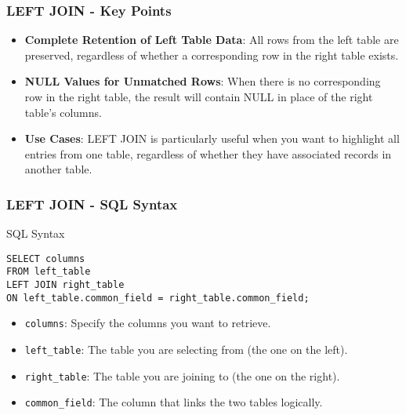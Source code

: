 \documentclass[aspectratio=169]{beamer}
\begin{document}
\begin{frame}[fragile]
    \frametitle{LEFT JOIN - Key Points}
    \begin{itemize}
        \item \textbf{Complete Retention of Left Table Data}: All rows from the left table are preserved, regardless of whether a corresponding row in the right table exists.
        
        \item \textbf{NULL Values for Unmatched Rows}: When there is no corresponding row in the right table, the result will contain NULL in place of the right table's columns.
        
        \item \textbf{Use Cases}: LEFT JOIN is particularly useful when you want to highlight all entries from one table, regardless of whether they have associated records in another table.
    \end{itemize}
\end{frame}

\begin{frame}[fragile]
    \frametitle{LEFT JOIN - SQL Syntax}
    \begin{block}{SQL Syntax}
    \begin{lstlisting}
SELECT columns
FROM left_table
LEFT JOIN right_table
ON left_table.common_field = right_table.common_field;
    \end{lstlisting}
    \end{block}

    \begin{itemize}
        \item \texttt{columns}: Specify the columns you want to retrieve.
        \item \texttt{left\_table}: The table you are selecting from (the one on the left).
        \item \texttt{right\_table}: The table you are joining to (the one on the right).
        \item \texttt{common\_field}: The column that links the two tables logically.
    \end{itemize}
\end{frame}
\end{document}

